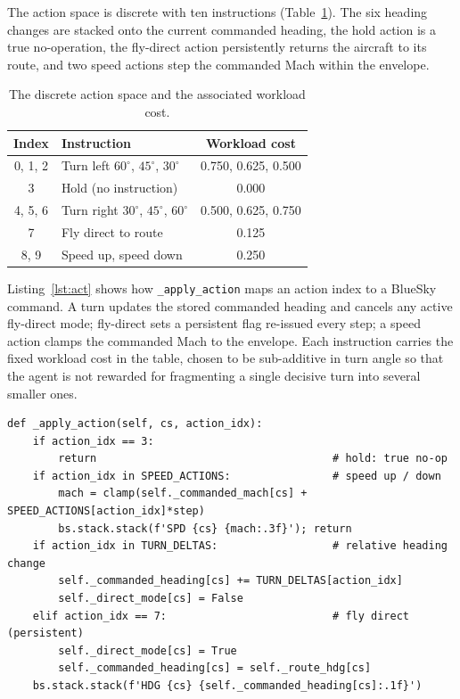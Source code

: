 The action space is discrete with ten instructions (Table~\ref{tab:act}). The six heading changes are stacked onto the current commanded heading, the hold action is a true no-operation, the fly-direct action persistently returns the aircraft to its route, and two speed actions step the commanded Mach within the envelope.

\begin{table}[htbp]
\centering
\caption{The discrete action space and the associated workload cost.}
\label{tab:act}
\begin{tabular}{clc}
\toprule
Index & Instruction & Workload cost \\
\midrule
0, 1, 2 & Turn left $60^\circ$, $45^\circ$, $30^\circ$  & 0.750, 0.625, 0.500 \\
3       & Hold (no instruction)                         & 0.000 \\
4, 5, 6 & Turn right $30^\circ$, $45^\circ$, $60^\circ$ & 0.500, 0.625, 0.750 \\
7       & Fly direct to route                           & 0.125 \\
8, 9    & Speed up, speed down                          & 0.250 \\
\bottomrule
\end{tabular}
\end{table}

Listing~\ref{lst:act} shows how \texttt{\_apply\_action} maps an action index to a BlueSky command. A turn updates the stored commanded heading and cancels any active fly-direct mode; fly-direct sets a persistent flag re-issued every step; a speed action clamps the commanded Mach to the envelope. Each instruction carries the fixed workload cost in the table, chosen to be sub-additive in turn angle so that the agent is not rewarded for fragmenting a single decisive turn into several smaller ones.

\begin{lstlisting}[caption={Mapping an action to a simulator command (\texttt{env.py}, abridged).}, label={lst:act}]
def _apply_action(self, cs, action_idx):
    if action_idx == 3:
        return                                     # hold: true no-op
    if action_idx in SPEED_ACTIONS:                # speed up / down
        mach = clamp(self._commanded_mach[cs] + SPEED_ACTIONS[action_idx]*step)
        bs.stack.stack(f'SPD {cs} {mach:.3f}'); return
    if action_idx in TURN_DELTAS:                  # relative heading change
        self._commanded_heading[cs] += TURN_DELTAS[action_idx]
        self._direct_mode[cs] = False
    elif action_idx == 7:                          # fly direct (persistent)
        self._direct_mode[cs] = True
        self._commanded_heading[cs] = self._route_hdg[cs]
    bs.stack.stack(f'HDG {cs} {self._commanded_heading[cs]:.1f}')
\end{lstlisting}


